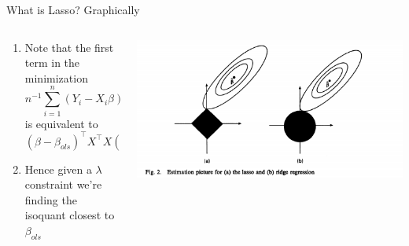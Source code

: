 \begin{frame}[allowframebreaks]{What is Lasso? Graphically}
  \begin{columns}[T] %
    \begin{column}{.35\textwidth}
      \begin{enumerate}[-]
      \item Note that the first term in the  minimization
        $$n^{-1}\sum_{i=1}^{n}(Y_{i} - X_{i}\beta)^{2}$$
        is equivalent to
        $$(\beta- \beta_{ols})^\top X^\top X(\beta- \beta_{ols}) + C$$
      \item Hence given a $\lambda$ constraint we're finding the
        isoquant closest to $\beta_{ols}$
      \end{enumerate}
    \end{column}%
  \hfill%
  \begin{column}{.65\textwidth}
    \includegraphics[width=\linewidth]{tibshiriani.png}
  \end{column}
\end{columns}
\end{frame}

